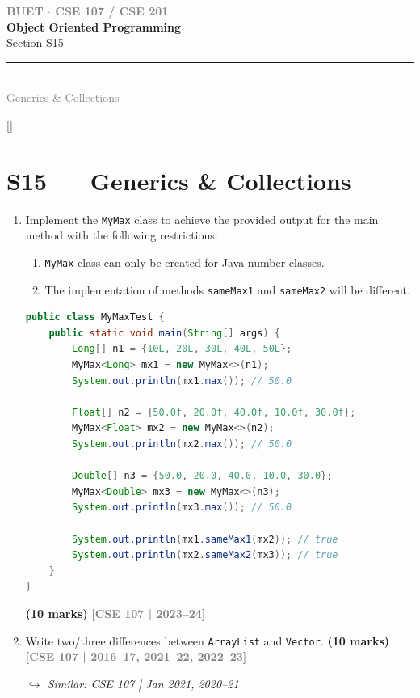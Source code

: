 \documentclass[12pt,a3paper]{article}
\newcommand{\yr}[1]{\hfill\textcolor{gray}{\small\textbf{[#1]}}}
\newcommand{\mk}[1]{\textcolor{orange!70!black}{\small\textbf{(#1 marks)}}}
\newcommand{\variant}[1]{\par\vspace{1pt}\textcolor{blue!50!black}%
  {\footnotesize\textit{$\hookrightarrow$ Similar: #1}}}
\newcommand{\secdivider}[4]{%
  \newpage\thispagestyle{empty}%
  \vspace*{\fill}%
  \begin{tcolorbox}[enhanced,colback=#4!7,colframe=#3,boxrule=1.5pt,arc=8pt,
    left=20pt,right=20pt,top=22pt,bottom=22pt,
    shadow={3pt}{-3pt}{0pt}{black!15}]
    \centering
    {\large\textcolor{gray}{\textbf{BUET $\cdot$ CSE 107 / CSE 201}}}\\[8pt]
    {\fontsize{26}{32}\selectfont\bfseries\textcolor{#3}{Object Oriented Programming}}\\[6pt]
    {\fontsize{15}{19}\selectfont\textcolor{dgray}{#1}}\\[12pt]
    \textcolor{#3!60}{\rule{0.5\textwidth}{0.5pt}}\\[6pt]
    {\small\textcolor{gray}{#2}}
  \end{tcolorbox}%
  \vspace*{\fill}\newpage%
}
\begin{document}
\secdivider{Section S15}{Generics \& Collections}{cG}{cG}
\label{sec:S15}
\titleformat{\section}{\large\bfseries\color{cG}}{}{0em}{}[\titlerule]
\section{S15 --- Generics \& Collections}

\begin{enumerate}
\item Implement the \texttt{MyMax} class to achieve the provided output for the main method with the following restrictions:
\begin{enumerate}
    \item \texttt{MyMax} class can only be created for Java number classes.
    \item The implementation of methods \texttt{sameMax1} and \texttt{sameMax2} will be different.
\end{enumerate}

\begin{lstlisting}[language=Java]
public class MyMaxTest {
    public static void main(String[] args) {
        Long[] n1 = {10L, 20L, 30L, 40L, 50L};
        MyMax<Long> mx1 = new MyMax<>(n1);
        System.out.println(mx1.max()); // 50.0

        Float[] n2 = {50.0f, 20.0f, 40.0f, 10.0f, 30.0f};
        MyMax<Float> mx2 = new MyMax<>(n2);
        System.out.println(mx2.max()); // 50.0

        Double[] n3 = {50.0, 20.0, 40.0, 10.0, 30.0};
        MyMax<Double> mx3 = new MyMax<>(n3);
        System.out.println(mx3.max()); // 50.0

        System.out.println(mx1.sameMax1(mx2)); // true
        System.out.println(mx2.sameMax2(mx3)); // true
    }
}
\end{lstlisting}
\mk{10}
\yr{CSE 107 | 2023--24}




\item Write two/three differences between \texttt{ArrayList} and \texttt{Vector}. \mk{10}
\yr{CSE 107 | 2016--17, 2021--22, 2022--23}
\variant{CSE 107 | Jan 2021, 2020--21}


\end{enumerate}
\end{document}
